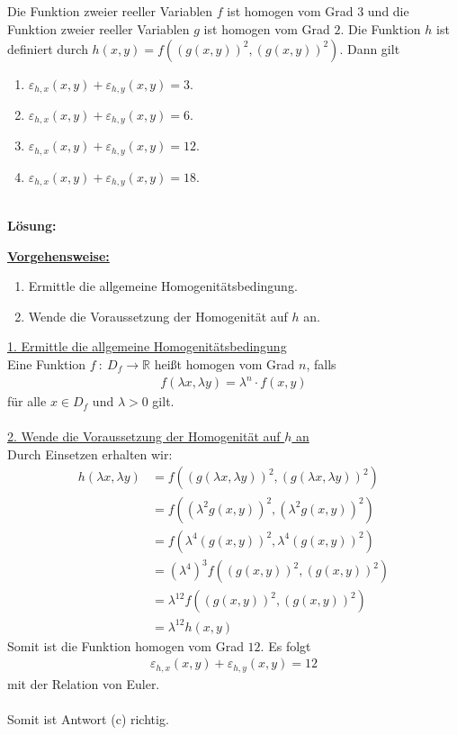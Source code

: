 \subsection*{}
Die Funktion zweier reeller Variablen $f$ ist homogen vom Grad $3$ und die Funktion zweier reeller Variablen $g$ ist homogen vom Grad $2$.
Die Funktion $h$ ist definiert durch
$h(x,y) = f\left( (g(x,y))^2, (g(x,y))^2 \right)$.
Dann gilt
\renewcommand{\labelenumi}{(\alph{enumi})}
\begin{enumerate}
\item $\varepsilon_{h,x}(x,y) + \varepsilon_{h,y}(x,y) = 3$.
\item $\varepsilon_{h,x}(x,y) + \varepsilon_{h,y}(x,y) = 6$.
\item $\varepsilon_{h,x}(x,y) + \varepsilon_{h,y}(x,y) = 12$.
\item $\varepsilon_{h,x}(x,y) + \varepsilon_{h,y}(x,y) = 18$.
\end{enumerate}
\ \\
\textbf{Lösung:}
\begin{mdframed}
\underline{\textbf{Vorgehensweise:}}
\renewcommand{\labelenumi}{\theenumi.}
\begin{enumerate}
\item Ermittle die allgemeine Homogenitätsbedingung.
\item Wende die Voraussetzung der Homogenität auf $h$ an.
\end{enumerate}
\end{mdframed}

\underline{1. Ermittle die allgemeine Homogenitätsbedingung} \\
Eine Funktion $f \ : \ D_f  \to \mathbb{R}$ heißt homogen vom Grad $n$, falls
\begin{align*}
f(\lambda x, \lambda y) = \lambda^n \cdot f(x,y)
\end{align*}
für alle $x \in D_f$ und $\lambda > 0$ gilt.
\\
\\

\underline{2. Wende die Voraussetzung der Homogenität auf $h$ an }\\
Durch Einsetzen erhalten wir:
\begin{align*}
h( \lambda x , \lambda y ) 
&= f \left( (g(\lambda x , \lambda y ))^2 , (g(\lambda x , \lambda y ))^2 \right)\\
&= f \left( ( \lambda^2 g(x,y) )^2, ( \lambda^2 g(x,y) )^2 \right)\\
&= f \left(  \lambda^4 (g(x,y) )^2, \lambda^4 (g(x,y) )^2 \right)
\\
&= \left(\lambda^4\right)^3 f \left(   (g(x,y) )^2,  (g(x,y) )^2 \right)\\
&= \lambda^{12} f \left(   (g(x,y) )^2,  (g(x,y) )^2 \right)\\
&= \lambda^{12} h(x,y)
\end{align*}
Somit ist die Funktion homogen vom Grad $12$. 
Es folgt 
\begin{align*}
\varepsilon_{h,x}(x,y) + \varepsilon_{h,y}(x,y) = 12
\end{align*}
mit der Relation von Euler.\\
\\
Somit ist Antwort (c) richtig.
